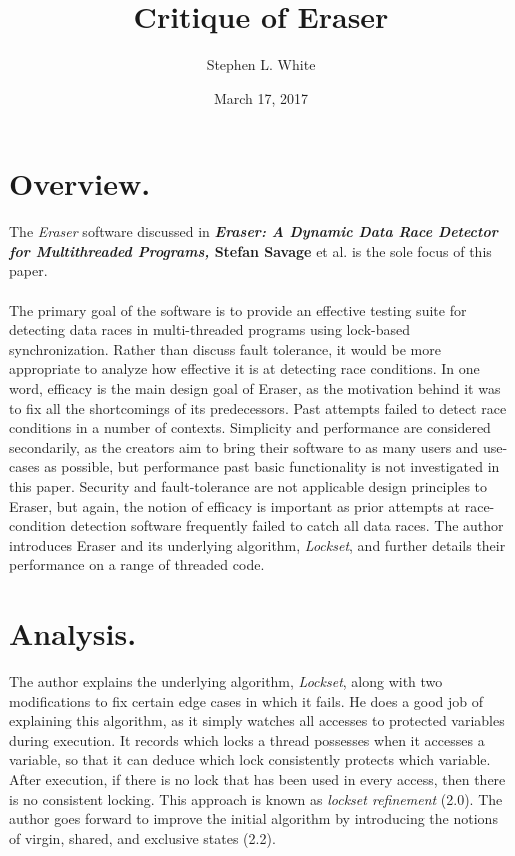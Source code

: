\documentclass[11pt]{article}
\title{Critique of Eraser}
\author{Stephen L. White}
\date{March 17, 2017}
\begin{document}
\section{Overview.}

The \textit{Eraser} software discussed in \textbf{\textit{Eraser: A Dynamic Data Race Detector for Multithreaded Programs,} Stefan Savage} et al. is the sole focus of this paper.
\paragraph{}
The primary goal of the software is to provide an effective testing suite for detecting data races in multi-threaded programs using lock-based synchronization. Rather than discuss fault tolerance, it would be more appropriate to analyze how effective it is at detecting race conditions. In one word, efficacy is the main design goal of Eraser, as the motivation behind it was to fix all the shortcomings of its predecessors. Past attempts failed to detect race conditions in a number of contexts. Simplicity and performance are considered secondarily, as the creators aim to bring their software to as many users and use-cases as possible, but performance past basic functionality is not investigated in this paper. Security and fault-tolerance are not applicable design principles to Eraser, but again, the notion of efficacy is important as prior attempts at race-condition detection software frequently failed to catch all data races. The author introduces Eraser and its underlying algorithm, \textit{Lockset}, and further details their performance on a range of threaded code.


\section{Analysis.}  %

The author explains the underlying algorithm, \textit{Lockset}, along with two modifications to fix certain edge cases in which it fails. He does a good job of explaining this algorithm, as it simply watches all accesses to protected variables during execution. It records which locks a thread possesses when it accesses a variable, so that it can deduce which lock consistently protects which variable. After execution, if there is no lock that has been used in every access, then there is no consistent locking. This approach is known as \textit{lockset refinement} (2.0). The author goes forward to improve the initial algorithm by introducing the notions of virgin, shared, and exclusive states (2.2).
\end{document}
